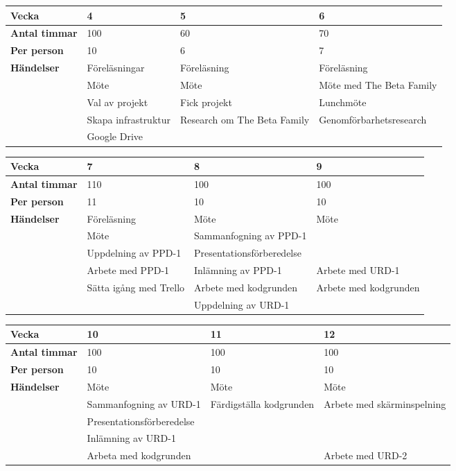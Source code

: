\begin{tabular}{ | p{65pt} || p{110pt} | p{110pt} | p{110pt} |}
  \hline
  \textbf{Vecka} & 4 & 5 & 6 \\ \hline
  \textbf{Antal timmar} & 100 & 60 & 70 \\ \hline
  \textbf{Per person} & 10 & 6 & 7 \\ \hline
  \textbf{Händelser} & Föreläsningar & Föreläsning & Föreläsning \\ \hline
  & Möte & Möte & Möte med The Beta Family  \\ \hline
  & Val av projekt & Fick projekt & Lunchmöte\\ \hline
  & Skapa infrastruktur & Research om The Beta Family & Genomförbarhetsresearch\\ \hline
  & Google Drive &  & \\ \hline
\end{tabular}

\begin{tabular}{ | p{65pt} || p{110pt} | p{110pt} | p{110pt} |}
  \hline
  \textbf{Vecka} & 7 & 8 & 9  \\ \hline
  \textbf{Antal timmar} & 110 & 100 & 100\\ \hline
  \textbf{Per person} & 11 & 10 & 10\\ \hline
  \textbf{Händelser} & Föreläsning & Möte & Möte\\ \hline
  & Möte & Sammanfogning av PPD-1 &\\ \hline
  & Uppdelning av PPD-1 & Presentationsförberedelse &  \\ \hline
  & Arbete med PPD-1 & Inlämning av PPD-1 & Arbete med URD-1 \\ \hline
  & Sätta igång med Trello & Arbete med kodgrunden & Arbete med kodgrunden \\ \hline
& & Uppdelning av URD-1 & \\ \hline
\end{tabular}

\begin{tabular}{ | p{65pt} || p{110pt} | p{110pt} | p{110pt} |}
  \hline
  \textbf{Vecka} & 10 & 11 & 12  \\ \hline
  \textbf{Antal timmar} & 100 & 100 & 100 \\ \hline
  \textbf{Per person} & 10 & 10 & 10 \\ \hline
  \textbf{Händelser} & Möte & Möte & Möte\\ \hline
  & Sammanfogning av URD-1 & Färdigställa kodgrunden & Arbete med skärminspelning\\ \hline
  & Presentationsförberedelse &  &  \\ \hline
  & Inlämning av URD-1 &  &  \\ \hline
  & Arbeta med kodgrunden &  & Arbete med URD-2 \\ \hline
\end{tabular}

